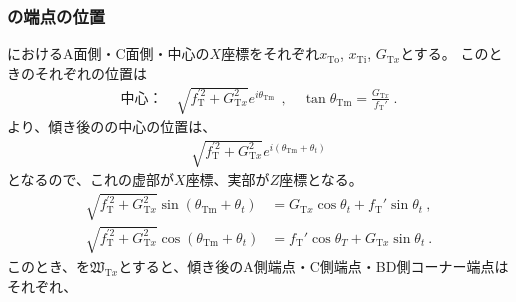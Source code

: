 \subsubsection{\TopCurvedOutcut の端点の位置}
\TopEndFace におけるA面側・C面側・中心の$X$座標をそれぞれ$x_\mathrm{To}$, $x_\mathrm{Ti}$, $G_{\mathrm Tx}$とする。
このとき\TopEndFace のそれぞれの位置は
\begin{align}
  \text{中心：}\quad
  \sqrt{f_\mathrm T^{'2}+G_{\mathrm Tx}^2}e^{i\theta_\mathrm{Tm}}~~, \quad
  \tan\theta_\mathrm{Tm} = \frac{G_{\mathrm Tx}}{f_\mathrm T'}\ .
\end{align}
より、傾き後の\nameTopEndFace の中心の位置は、
\begin{align*}
  \sqrt{f_\mathrm T^{'2}+G_{\mathrm Tx}^2}e^{i(\theta_\mathrm{Tm}+\theta_t)}
\end{align*}
となるので、これの虚部が$X$座標、実部が$Z$座標となる。
\begin{align*}
  \sqrt{f_\mathrm T^{'2}+G_{\mathrm Tx}^2}\sin(\theta_\mathrm{Tm}+\theta_t)
  &= G_{\mathrm Tx}\cos\theta_t+f_\mathrm T'\sin\theta_t~,\\
  \sqrt{f_\mathrm T^{'2}+G_{\mathrm Tx}^2}\cos(\theta_\mathrm{Tm}+\theta_t)
  &= f_\mathrm T'\cos\theta_T+G_{\mathrm Tx}\sin\theta_t~.
\end{align*}
このとき、\TopOutcutACWidth を$\mathfrak W_{\mathrm Tx}$とすると、傾き後のA側端点・C側端点・BD側コーナー端点はそれぞれ、
